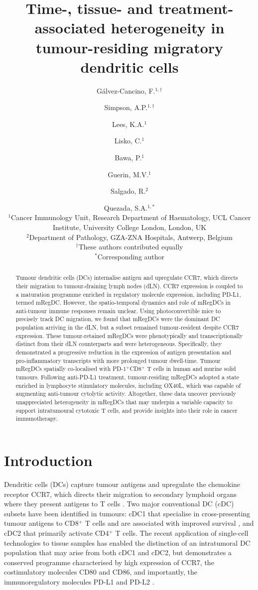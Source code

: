 \documentclass[11pt]{article}
\title{Time-, tissue- and treatment-associated heterogeneity in tumour-residing migratory dendritic cells}
\author{
G\'{a}lvez-Cancino, F.$^{1,\dagger}$ \and Simpson, A.P.$^{1,\dagger}$ \and Lees, K.A.$^{1}$ \and Lisko, C.$^{1}$ \and Bawa, P.$^{1}$ \and Guerin, M.V.$^{1}$ \and Salgado, R.$^{2}$ \and Quezada, S.A.$^{1,*}$\\[6pt]
\small $^{1}$Cancer Immunology Unit, Research Department of Haematology, UCL Cancer Institute, University College London, London, UK\\
\small $^{2}$Department of Pathology, GZA-ZNA Hospitals, Antwerp, Belgium\\
\small $^{\dagger}$These authors contributed equally\\
\small $^{*}$Corresponding author
}
\date{}
\begin{document}
\maketitle

\begin{abstract}
Tumour dendritic cells (DCs) internalise antigen and upregulate CCR7, which directs their migration to tumour-draining lymph nodes (dLN). CCR7 expression is coupled to a maturation programme enriched in regulatory molecule expression, including PD-L1, termed mRegDC. However, the spatio-temporal dynamics and role of mRegDCs in anti-tumour immune responses remain unclear. Using photoconvertible mice to precisely track DC migration, we found that mRegDCs were the dominant DC population arriving in the dLN, but a subset remained tumour-resident despite CCR7 expression. These tumour-retained mRegDCs were phenotypically and transcriptionally distinct from their dLN counterparts and were heterogeneous. Specifically, they demonstrated a progressive reduction in the expression of antigen presentation and pro-inflammatory transcripts with more prolonged tumour dwell-time. Tumour mRegDCs spatially co-localised with PD-1$^+$CD8$^+$ T cells in human and murine solid tumours. Following anti-PD-L1 treatment, tumour-residing mRegDCs adopted a state enriched in lymphocyte stimulatory molecules, including OX40L, which was capable of augmenting anti-tumour cytolytic activity. Altogether, these data uncover previously unappreciated heterogeneity in mRegDCs that may underpin a variable capacity to support intratumoural cytotoxic T cells, and provide insights into their role in cancer immunotherapy.
\end{abstract}

\section{Introduction}

Dendritic cells (DCs) capture tumour antigens and upregulate the chemokine receptor CCR7, which directs their migration to secondary lymphoid organs where they present antigens to T cells \citep{sallusto1998, roberts2016}. Two major conventional DC (cDC) subsets have been identified in tumours: cDC1 that specialise in cross-presenting tumour antigens to CD8$^+$ T cells and are associated with improved survival \citep{bottcher2018}, and cDC2 that primarily activate CD4$^+$ T cells. The recent application of single-cell technologies to tissue samples has enabled the distinction of an intratumoral DC population that may arise from both cDC1 and cDC2, but demonstrates a conserved programme characterised by high expression of CCR7, the costimulatory molecules CD80 and CD86, and importantly, the immunoregulatory molecules PD-L1 and PD-L2 \citep{maier2020, gerhard2021}.
\end{document}
